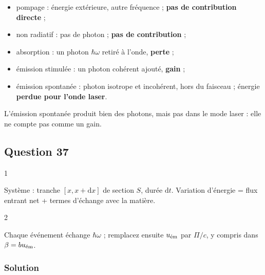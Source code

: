 \documentclass[11pt,a4paper]{article}
\providecommand{\tightlist}{\setlength{\itemsep}{0pt}\setlength{\parskip}{0pt}}
\newcommand{\equationajustee}[1]{%
  \sbox{\boiteequation}{$\displaystyle #1$}%
  \ifdim\wd\boiteequation>\linewidth
    \[\resizebox{\linewidth}{!}{\usebox{\boiteequation}}\]%
  \else
    \[#1\]%
  \fi}
\begin{document}
\begin{itemize}
\tightlist
\item
  pompage : énergie extérieure, autre fréquence ; \textbf{pas de contribution directe} ;
\item
  non radiatif : pas de photon ; \textbf{pas de contribution} ;
\item
  absorption : un photon \(\hbar\omega\) retiré à l'onde, \textbf{perte} ;
\item
  émission stimulée : un photon cohérent ajouté, \textbf{gain} ;
\item
  émission spontanée : photon isotrope et incohérent, hors du faisceau ; énergie \textbf{perdue pour l'onde laser}.
\end{itemize}

\begin{piege}

L'émission spontanée produit bien des photons, mais pas dans le mode laser : elle ne compte pas comme un gain.

\end{piege}

\hypertarget{question-37}{%
\subsection{Question 37}\label{question-37}}

\begin{indication}{1}

Système : tranche \([x,x+\mathrm dx]\) de section \(S\), durée \(\mathrm dt\). Variation d'énergie = flux entrant net + termes d'échange avec la matière.

\end{indication}

\begin{indication}{2}

Chaque événement échange \(\hbar\omega\) ; remplacez ensuite \(u_{\text{\text{ém}}}\) par \(\Pi/c\), y compris dans \(\beta=bu_{\text{\text{ém}}}\).

\end{indication}

\hypertarget{solution-36}{%
\subsubsection{Solution}\label{solution-36}}

\equationajustee{\frac{\partial u_{\text{\text{ém}}}}{\partial t}=-\frac{\partial\Pi}{\partial x}+\hbar\omega\beta(n_2-n_1)-\hbar\omega An_2}
\end{document}
